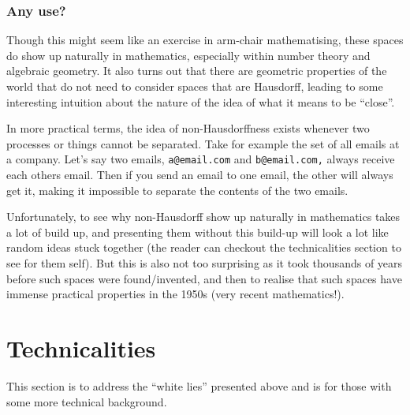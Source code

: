 \documentclass{article}
\begin{document}
\subsubsection*{Any use?}

Though this might seem like an exercise in arm-chair mathematising, these spaces do show up naturally in
mathematics, especially within number theory and algebraic geometry. It also turns out that there are geometric
properties of the world that do not need to consider spaces that are Hausdorff, leading to some interesting
intuition about the nature of the idea of what it means to be ``close''.

In more practical terms, the idea of non-Hausdorffness exists whenever two processes or things cannot be
separated. Take for example the set of all emails at a company. Let's say two emails, \texttt{a@email.com} and
\texttt{b@email.com,} always receive each others email. Then if you send an email to one email, the other will always
get it, making it impossible to separate the contents of the two emails.

Unfortunately, to see why non-Hausdorff show up naturally in mathematics takes a lot of build up, and
presenting them without this build-up will look a lot like random ideas stuck together (the reader can
checkout the technicalities section to see for them self). But this is also not too surprising as it took
thousands of years before  such spaces were found/invented, and then to realise that such spaces have immense
practical properties in the 1950s (very recent mathematics!).

\section{Technicalities}

This section is to address the ``white lies'' presented above and is for those with some more technical
background.
\end{document}
